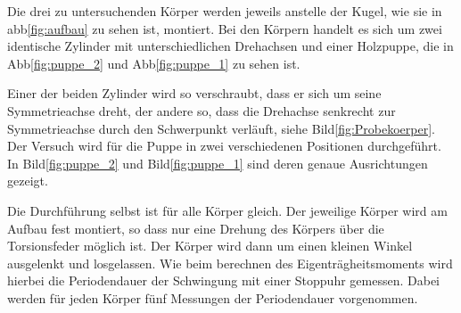 Die drei zu untersuchenden Körper werden jeweils anstelle der Kugel, wie sie in abb\ref{fig:aufbau} zu sehen ist, montiert.
Bei den Körpern handelt es sich um zwei identische Zylinder mit unterschiedlichen Drehachsen und einer Holzpuppe, die in 
Abb\ref{fig:puppe_2} und Abb\ref{fig:puppe_1} zu sehen ist. 

Einer der beiden Zylinder wird so verschraubt, dass er sich um seine Symmetrieachse dreht, der andere so, dass die Drehachse senkrecht
zur Symmetrieachse durch den Schwerpunkt verläuft, siehe Bild\:\ref{fig:Probekoerper}. Der Versuch wird für die Puppe in zwei 
verschiedenen Positionen durchgeführt. In Bild\:\ref{fig:puppe_2} und Bild\:\ref{fig:puppe_1} sind deren genaue Ausrichtungen gezeigt. 

Die Durchführung selbst ist für alle Körper gleich. Der jeweilige Körper wird am Aufbau fest montiert, so dass nur eine Drehung des 
Körpers über die Torsionsfeder möglich ist. Der Körper wird dann um einen kleinen Winkel ausgelenkt und losgelassen. Wie beim berechnen
des Eigenträgheitsmoments wird hierbei die Periodendauer der Schwingung mit einer Stoppuhr gemessen. Dabei werden für jeden Körper 
fünf Messungen der Periodendauer vorgenommen. 


